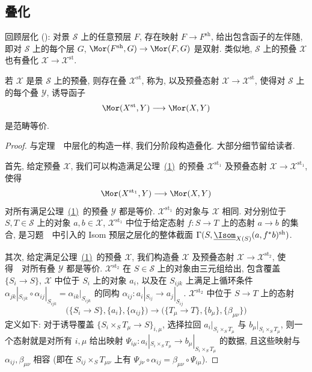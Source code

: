 \subsection{叠化}\label{src:3.5.6-subsection}
回顾层化 (): 对景 $\mathcal S$ 上的任意预层 $F$, 存在映射 $F\to F^{\mathrm{sh}}$, 给出包含函子的左伴随, 即对 $\mathcal S$ 上的每个层 $G$, $\Mor(F^{\mathrm{sh}},G)\to\Mor(F,G)$ 是双射. 类似地, $\mathcal S$ 上的预叠 $\mathcal X$ 也有叠化 $\mathcal X\to\mathcal X^{\mathrm{st}}$.
\begin{theorem}[叠化]\label{src:3.5.18}
若 $\mathcal X$ 是景 $\mathcal S$ 上的预叠, 则存在叠 $\mathcal X^{\mathrm{st}}$, 称为, 以及预叠态射 $\mathcal X\to\mathcal X^{\mathrm{st}}$, 使得对 $\mathcal S$ 上的每个叠 $\mathcal Y$, 诱导函子
\begin{equation}\label{src:3.5.19}
\Mor(\mathcal X^{\mathrm{st}},\mathcal Y)\longrightarrow\Mor(\mathcal X,\mathcal Y)
\end{equation}
是范畴等价.
\end{theorem}
\begin{proof}
与定理~~中层化的构造一样, 我们分阶段构造叠化. 大部分细节留给读者.

首先, 给定预叠 $\mathcal X$, 我们可以构造满足公理~\hyperlink{stack-axiom-1}{(1)}~的预叠 $\mathcal X^{\mathrm{st}_1}$ 及预叠态射 $\mathcal X\to\mathcal X^{\mathrm{st}_1}$, 使得
\[
\Mor(\mathcal X^{\mathrm{st}_1},\mathcal Y)\longrightarrow\Mor(\mathcal X,\mathcal Y)
\]
对所有满足公理~\hyperlink{stack-axiom-1}{(1)}~的预叠 $\mathcal Y$ 都是等价. $\mathcal X^{\mathrm{st}_1}$ 的对象与 $\mathcal X$ 相同. 对分别位于 $S,T\in\mathcal S$ 上的对象 $a,b\in\mathcal X$, $\mathcal X^{\mathrm{st}_1}$ 中位于给定态射 $f:S\to T$ 上的态射 $a\to b$ 的集合, 是习题~~中引入的 Isom 预层之层化的整体截面
$\Gamma(S,\underline{\Isom}_{\mathcal X(S)}(a,f^*b)^{\mathrm{sh}})$.

其次, 给定满足公理~\hyperlink{stack-axiom-1}{(1)}~的预叠 $\mathcal X$, 我们构造叠 $\mathcal X$ 及预叠态射 $\mathcal X\to\mathcal X^{\mathrm{st}_2}$, 使得~~对所有叠 $\mathcal Y$ 都是等价.
$\mathcal X^{\mathrm{st}_2}$ 在 $S\in\mathcal S$ 上的对象由三元组给出, 包含覆盖 $\{S_i\to S\}$, $\mathcal X$ 中位于 $S_i$ 上的对象 $a_i$, 以及在 $S_{ijk}$ 上满足上循环条件 $\alpha_{jk}|_{S_{ijk}}\circ\alpha_{ij}|_{S_{ijk}}=\alpha_{ik}|_{S_{ijk}}$ 的同构 $\alpha_{ij}:a_i|_{S_{ij}}\to a_j|_{S_{ij}}$.
$\mathcal X^{\mathrm{st}_2}$ 中位于 $S\to T$ 上的态射
\[
\bigl(\{S_i\to S\},\{a_i\},\{\alpha_{ij}\}\bigr)
\longrightarrow
\bigl(\{T_\mu\to T\},\{b_\mu\},\{\beta_{\mu\nu}\}\bigr)
\]
定义如下: 对于诱导覆盖 $\{S_i\times_S T_\mu\to S\}_{i,\mu}$, 选择拉回 $a_i|_{S_i\times_S T_\mu}$ 与 $b_\mu|_{S_i\times_S T_\mu}$, 则一个态射就是对所有 $i,\mu$ 给出映射 $\Psi_{i\mu}:a_i|_{S_i\times_S T_\mu}\to b_\mu|_{S_i\times_S T_\mu}$ 的数据, 且这些映射与 $\alpha_{ij},\beta_{\mu\nu}$ 相容 (即在 $S_{ij}\times_S T_{\mu\nu}$ 上有 $\Psi_{j\nu}\circ\alpha_{ij}=\beta_{\mu\nu}\circ\Psi_{i\mu}$).
\end{proof}
